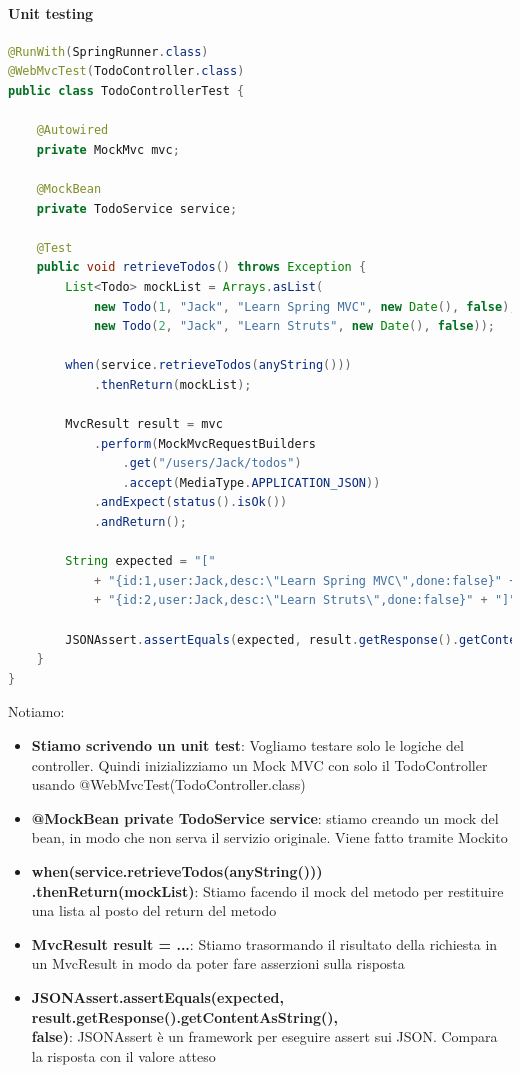 \documentclass[11pt,a4paper]{book}
\begin{document}
\paragraph{Unit testing}
\begin{lstlisting}[language = Java]
@RunWith(SpringRunner.class)
@WebMvcTest(TodoController.class)
public class TodoControllerTest {

	@Autowired
	private MockMvc mvc;

	@MockBean
	private TodoService service;

	@Test
	public void retrieveTodos() throws Exception {
		List<Todo> mockList = Arrays.asList(
			new Todo(1, "Jack",	"Learn Spring MVC", new Date(), false), 
			new Todo(2, "Jack",	"Learn Struts", new Date(), false));
		
		when(service.retrieveTodos(anyString()))
			.thenReturn(mockList);

		MvcResult result = mvc
			.perform(MockMvcRequestBuilders
				.get("/users/Jack/todos")
				.accept(MediaType.APPLICATION_JSON))
			.andExpect(status().isOk())
			.andReturn();
		
		String expected = "["
			+ "{id:1,user:Jack,desc:\"Learn Spring MVC\",done:false}" +","
			+ "{id:2,user:Jack,desc:\"Learn Struts\",done:false}" + "]";

		JSONAssert.assertEquals(expected, result.getResponse().getContentAsString(), false);
	}
}
\end{lstlisting}

Notiamo:
\begin{itemize}
	\item \textbf{Stiamo scrivendo un unit test}: Vogliamo testare solo le logiche del controller. Quindi inizializziamo un Mock MVC con solo il TodoController usando @WebMvcTest(TodoController.class)
	\item \textbf{@MockBean private TodoService service}: stiamo creando un mock del bean, in modo che non serva il servizio originale. Viene fatto tramite Mockito
	\item \textbf{when(service.retrieveTodos(anyString()))\\
		.thenReturn(mockList)}: Stiamo facendo il mock del metodo per restituire una lista al posto del return del metodo
	\item \textbf{MvcResult result = ...}: Stiamo trasormando il risultato della richiesta in un MvcResult in modo da poter fare asserzioni sulla risposta
	\item \textbf{JSONAssert.assertEquals(expected,\\
		result.getResponse().getContentAsString(),\\
		false)}: JSONAssert è un framework per eseguire assert sui JSON. Compara la risposta con il valore atteso
\end{itemize}
\end{document}
